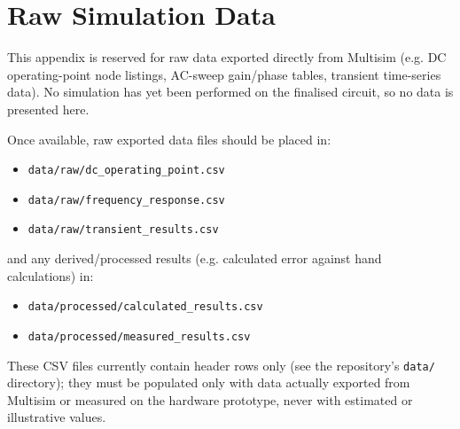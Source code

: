 \chapter{Raw Simulation Data}
\label{app:raw-sim-data}

This appendix is reserved for raw data exported directly from Multisim (e.g. DC operating-point node listings, AC-sweep gain/phase tables, transient time-series data). No simulation has yet been performed on the finalised circuit, so no data is presented here.

Once available, raw exported data files should be placed in:
\begin{itemize}
    \item \texttt{data/raw/dc\_operating\_point.csv}
    \item \texttt{data/raw/frequency\_response.csv}
    \item \texttt{data/raw/transient\_results.csv}
\end{itemize}
and any derived/processed results (e.g. calculated error against hand calculations) in:
\begin{itemize}
    \item \texttt{data/processed/calculated\_results.csv}
    \item \texttt{data/processed/measured\_results.csv}
\end{itemize}
These CSV files currently contain header rows only (see the repository's \texttt{data/} directory); they must be populated only with data actually exported from Multisim or measured on the hardware prototype, never with estimated or illustrative values.

